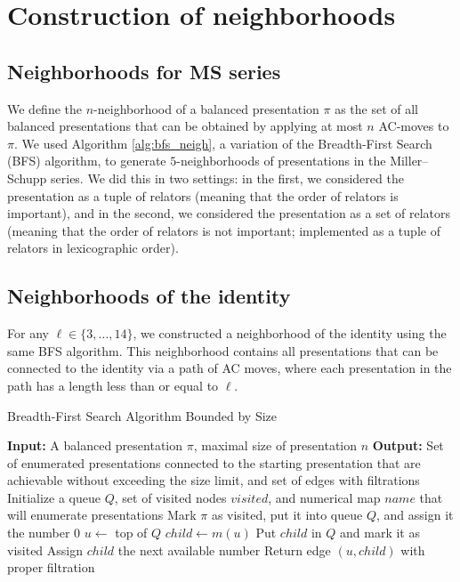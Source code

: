 
\section{Construction of neighborhoods}\label{s:neighborhoods}

\subsection{Neighborhoods for MS series}

We define the $n$-neighborhood of a balanced presentation $\pi$ as the set of all balanced presentations that can be obtained by applying at most $n$ AC-moves to $\pi$.
We used Algorithm \ref{alg:bfs_neigh}, a variation of the Breadth-First Search (BFS) algorithm, to generate $5$-neighborhoods of presentations in the Miller–Schupp series.
We did this in two settings: in the first, we considered the presentation as a tuple of relators (meaning that the order of relators is important), and in the second, we considered the presentation as a set of relators (meaning that the order of relators is not important; implemented as a tuple of relators in lexicographic order).

\subsection{Neighborhoods of the identity} For any $\ell \in \{3, \dots, 14\}$, we constructed a neighborhood of the identity using the same BFS algorithm. This neighborhood contains all presentations that can be connected to the identity via a path of AC moves, where each presentation in the path has a length less than or equal to $\ell$.

\begin{algorithm}
	\caption{Breadth-First Search Algorithm Bounded by Size}\label{alg:bfs_1}
	\begin{algorithmic}[1]
		\State \textbf{Input:} A balanced presentation $\pi$, maximal size of presentation $n$
		\State \textbf{Output:} Set of enumerated presentations connected to the starting presentation that are achievable without exceeding the size limit, and set of edges with filtrations
		\State Initialize a queue $Q$, set of visited nodes $visited$, and numerical map $name$ that will enumerate presentations
		\State Mark $\pi$ as visited, put it into queue $Q$, and assign it the number $0$
		\State $u \gets $ top of $Q$ 
		\State $child \gets m(u)$
		\State Put $child$ in $Q$ and mark it as visited
		\State Assign $child$ the next available number
		\EndIf
		\State Return edge $(u, child)$ with proper filtration
		\EndIf
		\EndFor
		\EndWhile
	\end{algorithmic}
\end{algorithm}

